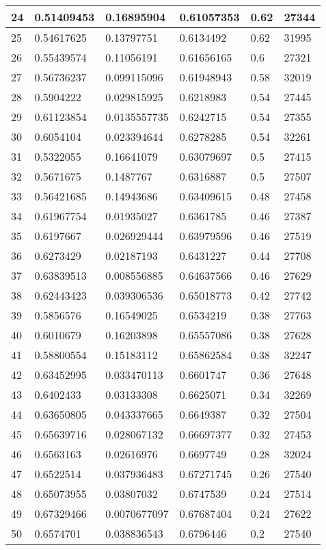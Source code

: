 \begin{longtable}{|l|l|l|l|l|l|}
24 & 0.51409453 & 0.16895904 & 0.61057353 & 0.62 & 27344 \\ \hline 
25 & 0.54617625 & 0.13797751 & 0.6134492 & 0.62 & 31995 \\ \hline 
26 & 0.55439574 & 0.11056191 & 0.61656165 & 0.6 & 27321 \\ \hline 
27 & 0.56736237 & 0.099115096 & 0.61948943 & 0.58 & 32019 \\ \hline 
28 & 0.5904222 & 0.029815925 & 0.6218983 & 0.54 & 27445 \\ \hline 
29 & 0.61123854 & 0.0135557735 & 0.6242715 & 0.54 & 27355 \\ \hline 
30 & 0.6054104 & 0.023394644 & 0.6278285 & 0.54 & 32261 \\ \hline 
31 & 0.5322055 & 0.16641079 & 0.63079697 & 0.5 & 27415 \\ \hline 
32 & 0.5671675 & 0.1487767 & 0.6316887 & 0.5 & 27507 \\ \hline 
33 & 0.56421685 & 0.14943686 & 0.63409615 & 0.48 & 27458 \\ \hline 
34 & 0.61967754 & 0.01935027 & 0.6361785 & 0.46 & 27387 \\ \hline 
35 & 0.6197667 & 0.026929444 & 0.63979596 & 0.46 & 27519 \\ \hline 
36 & 0.6273429 & 0.02187193 & 0.6431227 & 0.44 & 27708 \\ \hline 
37 & 0.63839513 & 0.008556885 & 0.64637566 & 0.46 & 27629 \\ \hline 
38 & 0.62443423 & 0.039306536 & 0.65018773 & 0.42 & 27742 \\ \hline 
39 & 0.5856576 & 0.16549025 & 0.6534219 & 0.38 & 27763 \\ \hline 
40 & 0.6010679 & 0.16203898 & 0.65557086 & 0.38 & 27628 \\ \hline 
41 & 0.58800554 & 0.15183112 & 0.65862584 & 0.38 & 32247 \\ \hline 
42 & 0.63452995 & 0.033470113 & 0.6601747 & 0.36 & 27648 \\ \hline 
43 & 0.6402433 & 0.03133308 & 0.6625071 & 0.34 & 32269 \\ \hline 
44 & 0.63650805 & 0.043337665 & 0.6649387 & 0.32 & 27504 \\ \hline 
45 & 0.65639716 & 0.028067132 & 0.66697377 & 0.32 & 27453 \\ \hline 
46 & 0.6563163 & 0.02616976 & 0.6697749 & 0.28 & 32024 \\ \hline 
47 & 0.6522514 & 0.037936483 & 0.67271745 & 0.26 & 27540 \\ \hline 
48 & 0.65073955 & 0.03807032 & 0.6747539 & 0.24 & 27514 \\ \hline 
49 & 0.67329466 & 0.0070677097 & 0.67687404 & 0.24 & 27622 \\ \hline 
50 & 0.6574701 & 0.038836543 & 0.6796446 & 0.2 & 27540 \\ \hline 
\end{longtable}